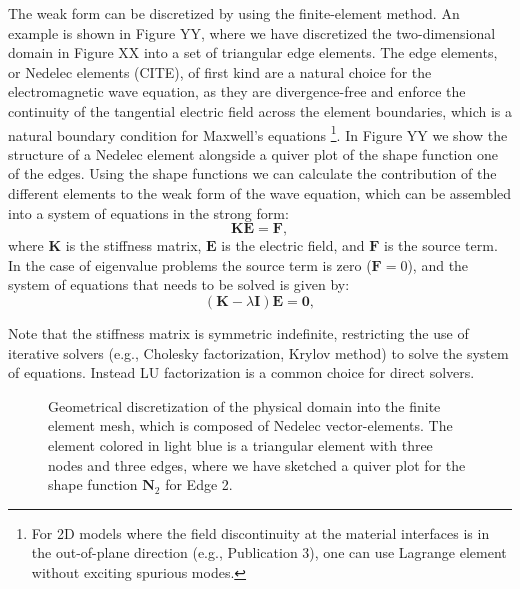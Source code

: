 The weak form can be discretized by using the finite-element method. An example is shown in Figure YY, 
where we have discretized the two-dimensional domain in Figure XX into a set of triangular edge elements. 
The edge elements, or Nedelec elements (CITE), of first kind are a natural choice for the electromagnetic 
wave equation, as they are divergence-free and enforce the continuity of the tangential electric field 
across the element boundaries, which is a natural boundary condition for Maxwell's equations 
\footnote{For 2D models where the field discontinuity at the material interfaces 
is in the out-of-plane direction (e.g., Publication 3), one can use Lagrange element without 
exciting spurious modes.}. In Figure YY
we show the structure of a Nedelec element alongside a quiver plot of the shape function one of the edges.
Using the shape functions we can calculate the contribution of the different elements to the weak form of the
wave equation, which can be assembled into a system of equations in the strong form:
\begin{equation}
    \mathbf{K} \mathbf{E} = \mathbf{F},
\end{equation}
where $\mathbf{K}$ is the stiffness matrix, $\mathbf{E}$ is the electric field, and $\mathbf{F}$ is the source
 term. In the case of eigenvalue problems the source term is zero ($\mathbf{F}=0$), and the system of equations 
that needs to be solved is given by:
\begin{equation}
    \left(\mathbf{K} - \lambda \mathbf{I} \right) \mathbf{E} =  \mathbf{0},
\end{equation}

Note that the stiffness matrix is symmetric indefinite, restricting the use of iterative solvers (e.g., Cholesky factorization, Krylov method) to solve the system of equations. Instead LU factorization is a common choice for direct solvers.
\begin{figure}[tb]
    \centering
    \caption{Geometrical discretization of the physical domain into the finite element mesh, which is composed of Nedelec vector-elements. The element colored in light blue is a triangular element with three nodes and three edges, where we have sketched a quiver plot for the shape function $\mathbf{N}_2$ for Edge 2.}
    \label{fig:fem}
\end{figure}

